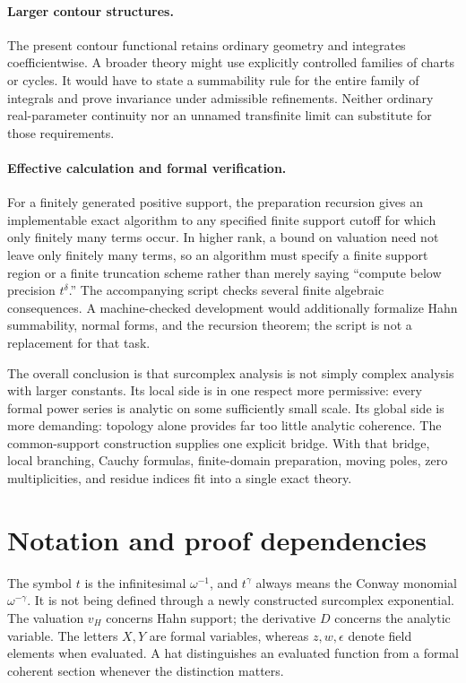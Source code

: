 \documentclass[11pt,a4paper]{article}
\theoremstyle{definition}\newtheorem{definition}[theorem]{Definition}
\theoremstyle{remark}\newtheorem{remark}[theorem]{Remark}
\numberwithin{equation}{section}
\begin{document}
\paragraph{Larger contour structures.}
The present contour functional retains ordinary geometry and integrates coefficientwise. A broader theory might use explicitly controlled families of charts or cycles. It would have to state a summability rule for the entire family of integrals and prove invariance under admissible refinements. Neither ordinary real-parameter continuity nor an unnamed transfinite limit can substitute for those requirements.

\paragraph{Effective calculation and formal verification.}
For a finitely generated positive support, the preparation recursion gives an implementable exact algorithm to any specified finite support cutoff for which only finitely many terms occur. In higher rank, a bound on valuation need not leave only finitely many terms, so an algorithm must specify a finite support region or a finite truncation scheme rather than merely saying ``compute below precision $t^\delta$.'' The accompanying script checks several finite algebraic consequences. A machine-checked development would additionally formalize Hahn summability, normal forms, and the recursion theorem; the script is not a replacement for that task.

The overall conclusion is that surcomplex analysis is not simply complex analysis with larger constants. Its local side is in one respect more permissive: every formal power series is analytic on some sufficiently small scale. Its global side is more demanding: topology alone provides far too little analytic coherence. The common-support construction supplies one explicit bridge. With that bridge, local branching, Cauchy formulas, finite-domain preparation, moving poles, zero multiplicities, and residue indices fit into a single exact theory.

\appendix
\section{Notation and proof dependencies}
The symbol $t$ is the infinitesimal $\omega^{-1}$, and $t^\gamma$ always means the Conway monomial $\omega^{-\gamma}$. It is not being defined through a newly constructed surcomplex exponential. The valuation $v_H$ concerns Hahn support; the derivative $D$ concerns the analytic variable. The letters $X,Y$ are formal variables, whereas $z,w,\epsilon$ denote field elements when evaluated. A hat distinguishes an evaluated function from a formal coherent section whenever the distinction matters.
\end{document}
